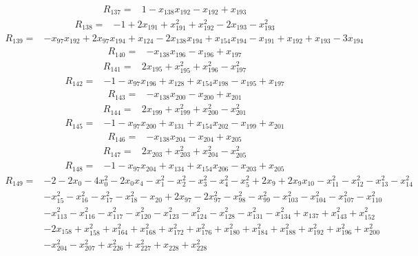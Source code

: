 \begin{align*}
 R_{137}={}&1 -x_{138}x_{192} -x_{192} +x_{193}
\end{align*}
\begin{align*}
 R_{138}={}&-1 +2x_{191} +x_{191}^{2} +x_{192}^{2} -2x_{193} -x_{193}^{2}
\end{align*}
\begin{align*}
 R_{139}={}&-x_{97}x_{192} +2x_{97}x_{194} +x_{124} -2x_{138}x_{194} +x_{154}x_{194} -x_{191} +x_{192} +x_{193} -3x_{194}
\end{align*}
\begin{align*}
 R_{140}={}&-x_{138}x_{196} -x_{196} +x_{197}
\end{align*}
\begin{align*}
 R_{141}={}&2x_{195} +x_{195}^{2} +x_{196}^{2} -x_{197}^{2}
\end{align*}
\begin{align*}
 R_{142}={}&-1 -x_{97}x_{196} +x_{128} +x_{154}x_{198} -x_{195} +x_{197}
\end{align*}
\begin{align*}
 R_{143}={}&-x_{138}x_{200} -x_{200} +x_{201}
\end{align*}
\begin{align*}
 R_{144}={}&2x_{199} +x_{199}^{2} +x_{200}^{2} -x_{201}^{2}
\end{align*}
\begin{align*}
 R_{145}={}&-1 -x_{97}x_{200} +x_{131} +x_{154}x_{202} -x_{199} +x_{201}
\end{align*}
\begin{align*}
 R_{146}={}&-x_{138}x_{204} -x_{204} +x_{205}
\end{align*}
\begin{align*}
 R_{147}={}&2x_{203} +x_{203}^{2} +x_{204}^{2} -x_{205}^{2}
\end{align*}
\begin{align*}
 R_{148}={}&-1 -x_{97}x_{204} +x_{134} +x_{154}x_{206} -x_{203} +x_{205}
\end{align*}
\begin{align*}
 R_{149}={}&-2 -2x_{0} -4x_{0}^{2} -2x_{0}x_{4} -x_{1}^{2} -x_{2}^{2} -x_{3}^{2} -x_{4}^{2} -x_{5}^{2} +2x_{9} +2x_{9}x_{10} -x_{11}^{2} -x_{12}^{2} -x_{13}^{2} -x_{14}^{2}\\
 &-x_{15}^{2} -x_{16}^{2} -x_{17}^{2} -x_{18}^{2} -x_{20} +2x_{97} -2x_{97}^{2} -x_{98}^{2} -x_{99}^{2} -x_{103}^{2} -x_{104}^{2} -x_{107}^{2} -x_{110}^{2}\\
 &-x_{113}^{2} -x_{116}^{2} -x_{117}^{2} -x_{120}^{2} -x_{123}^{2} -x_{124}^{2} -x_{128}^{2} -x_{131}^{2} -x_{134}^{2} +x_{137} +x_{143}^{2} +x_{152}^{2}\\
 &-2x_{158} +x_{158}^{2} +x_{164}^{2} +x_{168}^{2} +x_{172}^{2} +x_{176}^{2} +x_{180}^{2} +x_{184}^{2} +x_{188}^{2} +x_{192}^{2} +x_{196}^{2} +x_{200}^{2}\\
 &-x_{204}^{2} -x_{207}^{2} +x_{226}^{2} +x_{227}^{2} +x_{228} +x_{228}^{2}
\end{align*}
